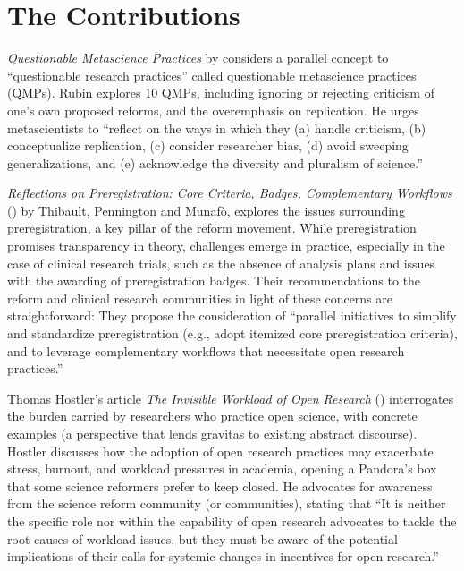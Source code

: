 \documentclass[authordate, editorial,noabstract]{jote-new-article}
\begin{document}
\section{The Contributions}



\emph{Questionable Metascience Practices} by \textcite{Rubin2023} considers a parallel concept to “questionable research practices” called questionable metascience practices (QMPs). Rubin explores 10 QMPs, including ignoring or rejecting criticism of one's own proposed reforms, and the overemphasis on replication. He urges metascientists to “reflect on the ways in which they (a) handle criticism, (b) conceptualize replication, (c) consider researcher bias, (d) avoid sweeping generalizations, and (e) acknowledge the diversity and pluralism of science.”



\emph{Reflections on Preregistration: Core Criteria, Badges, Complementary Workflows }(\hspace*{-2pt}\citeyear{Thibault2023}) by Thibault, Pennington and Munafò, explores the issues surrounding preregistration, a key pillar of the reform movement. While preregistration promises transparency in theory, challenges emerge in practice, especially in the case of clinical research trials, such as the absence of analysis plans and issues with the awarding of preregistration badges. Their recommendations to the reform and clinical research communities in light of these concerns are straightforward: They propose the consideration of “parallel initiatives to simplify and standardize preregistration (e.g., adopt itemized core preregistration criteria), and to leverage complementary workflows that necessitate open research practices.”



Thomas Hostler's article \emph{The Invisible Workload of Open Research} (\hspace*{-2pt}\citeyear{Hostler2023}) interrogates the burden carried by researchers who practice open science, with concrete examples (a perspective that lends gravitas to existing abstract discourse). Hostler discusses how the adoption of open research practices may exacerbate stress, burnout, and workload pressures in academia, opening a Pandora's box that some science reformers prefer to keep closed. He advocates for awareness from the science reform community (or communities), stating that “It is neither the specific role nor within the capability of open research advocates to tackle the root causes of workload issues, but they must be aware of the potential implications of their calls for systemic changes in incentives for open research.”
\end{document}
